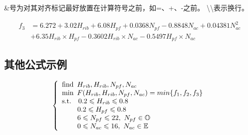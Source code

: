\&号为对其对齐标记最好放置在计算符号之前，如=、+、-之前。
\backslash\backslash 表示换行。

\begin{equation}\label{eq:P}
    \begin{split}
        f_3 & = 6.272 + 3.02 H_{rib} + 6.08 H_{pf} + 0.0368 N_{pf} - 0.8848 N_{ac} + 0.04381 N_{ac}^2\\
        & + 6.35 H_{rib} \times H_{pf} - 0.3602 H_{rib}\times N_{ac} - 0.5497 H_{pf}\times N_{ac}
    \end{split}
\end{equation}

\subsection{其他公式示例}
\begin{equation}
    \begin{aligned}
    \left\{
        \begin{array}{l}
        \text {find}\enspace H_{rib},H_{rib},N_{pf},N_{ac} \\
        \text {min} \enspace F(H_{rib},H_{rib},N_{pf},N_{ac})= min\{f_1,f_2,f_3\} \\

            \text{s.t.\enspace}\enspace 0.2 \leqslant H_{rib} \leqslant 0.8                    \\
            \hspace{2.2em} 0.2 \leqslant H_{pf} \leqslant 0.8                     \\
            \hspace{2.2em} 6 \leqslant N_{pf} \leqslant 22,\ N_{pf}\in \mathbb{O} \\
            \hspace{2.2em} 0 \leqslant N_{ac} \leqslant 16,\ N_{ac}\in \mathbb{E}
        \end{array}
    \right. 
    \end{aligned}
    \label{eq:MO}
\end{equation}